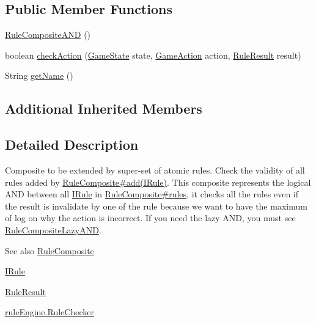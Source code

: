 \subsection*{Public Member Functions}
\begin{DoxyCompactItemize}
\item 
\mbox{\hyperlink{classrule_engine_1_1rules_1_1new_rules_1_1_rule_composite_a_n_d_a0ffaffcc28c95914802855e234bcb60f}{Rule\+Composite\+A\+ND}} ()
\item 
boolean \mbox{\hyperlink{classrule_engine_1_1rules_1_1new_rules_1_1_rule_composite_a_n_d_aa7e869573bdce2cea2551d83c4546bc4}{check\+Action}} (\mbox{\hyperlink{classgame_1_1game_state_1_1_game_state}{Game\+State}} state, \mbox{\hyperlink{classrule_engine_1_1_game_action}{Game\+Action}} action, \mbox{\hyperlink{classrule_engine_1_1_rule_result}{Rule\+Result}} result)
\item 
String \mbox{\hyperlink{classrule_engine_1_1rules_1_1new_rules_1_1_rule_composite_a_n_d_a1807d41373e80bf5e2778e81a4148b7b}{get\+Name}} ()
\end{DoxyCompactItemize}
\subsection*{Additional Inherited Members}


\subsection{Detailed Description}
Composite to be extended by super-\/set of atomic rules. Check the validity of all rules added by \mbox{\hyperlink{classrule_engine_1_1rules_1_1new_rules_1_1_rule_composite_a4970c2904b55542c6c7323195a38c845}{Rule\+Composite\#add(\+I\+Rule)}}. This composite represents the logical A\+ND between all \mbox{\hyperlink{interfacerule_engine_1_1rules_1_1new_rules_1_1_i_rule}{I\+Rule}} in \mbox{\hyperlink{classrule_engine_1_1rules_1_1new_rules_1_1_rule_composite_a0f873c0c52e3cf4815d5b09a5ca2ae7f}{Rule\+Composite\#rules}}, it checks all the rules even if the result is invalidate by one of the rule because we want to have the maximum of log on why the action is incorrect. If you need the lazy A\+ND, you must see \mbox{\hyperlink{classrule_engine_1_1rules_1_1new_rules_1_1_rule_composite_lazy_a_n_d}{Rule\+Composite\+Lazy\+A\+ND}}.

\begin{DoxySeeAlso}{See also}
\mbox{\hyperlink{classrule_engine_1_1rules_1_1new_rules_1_1_rule_composite}{Rule\+Composite}} 

\mbox{\hyperlink{interfacerule_engine_1_1rules_1_1new_rules_1_1_i_rule}{I\+Rule}} 

\mbox{\hyperlink{classrule_engine_1_1_rule_result}{Rule\+Result}} 

\mbox{\hyperlink{classrule_engine_1_1_rule_checker}{rule\+Engine.\+Rule\+Checker}} 
\end{DoxySeeAlso}


